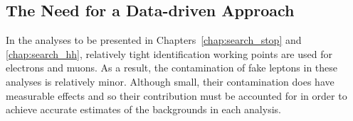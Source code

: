 %
%
\subsection{The Need for a Data-driven Approach}
\label{sec:fake_dd_motivation}

In the analyses to be presented in Chapters~\ref{chap:search_stop} and \ref{chap:search_hh},
relatively tight identification working points are used for electrons and muons.
As a result, the contamination of fake leptons in these analyses is relatively
minor.
Although small, their contamination does have measurable effects and so their contribution
must be accounted for in order to achieve accurate estimates of the backgrounds
in each analysis.

